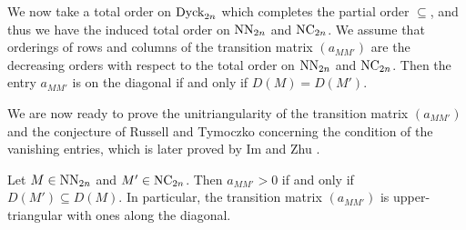 We now take a total order on \( \operatorname{Dyck}_{2n} \) which completes the partial order
\( \subseteq \), and thus we have the induced total order on
\( \operatorname{NN}_{2n} \) and \( \operatorname{NC}_{2n} \).
We assume that orderings of rows and columns of the transition matrix
\( (a_{MM'}) \) are the decreasing orders with respect to the total order
on \( \operatorname{NN}_{2n} \) and \( \operatorname{NC}_{2n} \).
Then the entry \( a_{MM'} \) is on the diagonal if and only if \( D(M)=D(M') \).

We are now ready to prove the unitriangularity of the transition matrix
$(a_{MM'})$ and the conjecture of Russell and Tymoczko
\cite[Conjecture 5.8]{RT19} concerning the condition of the vanishing entries,
which is later proved by Im and Zhu \cite[Theorem 1.1]{IZ22}.

\begin{cor}\label{Cor: unitriangularity}\cite{RT19,IZ22}
  Let \( M\in\operatorname{NN}_{2n} \) and \( M'\in\operatorname{NC}_{2n} \).
  Then \( a_{MM'} > 0 \) if and only if \( D(M') \subseteq D(M) \).
  In particular, the transition matrix $(a_{MM'})$ is upper-triangular with ones along the diagonal.
\end{cor}
